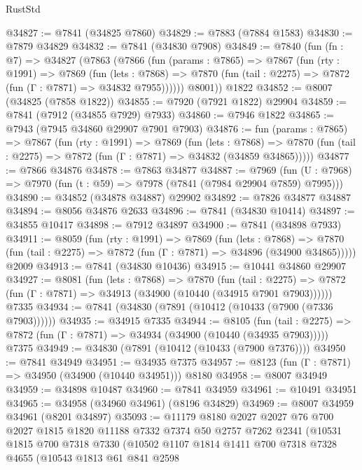 \begin{lexlean}{RustStd}
\begin{coremodule}
{\begin{coremodule}
{{{{{{{{{{{{{{{{{{{{{{{{{{{{{{{{{{{{{{{{{{{{{{{{{{{{{{@34827 := @7841 (@34825 @7860)
@34829 := @7883 (@7884 @1583)
@34830 := @7879 @34829
@34832 := @7841 (@34830 @7908)
@34849 := @7840
    (fun (fn : @7) =>
    @34827
      (@7863
        (@7866
          (fun (params : @7865) =>
          @7867
            (fun (rty : @1991) =>
            @7869
              (fun (lets : @7868) =>
              @7870 (fun (tail : @2275) => @7872 (fun (Γ : @7871) => @34832 @7955))))))
        @8001))
    @1822
@34852 := @8007 (@34825 (@7858 @1822))
@34855 := @7920 (@7921 @1822) @29904
@34859 := @7841 (@7912 (@34855 @7929) @7933)
@34860 := @7946 @1822
@34865 := @7943 (@7945 @34860 @29907 @7901 @7903)
@34876 := fun (params : @7865) =>
  @7867
    (fun (rty : @1991) =>
    @7869
      (fun (lets : @7868) =>
      @7870 (fun (tail : @2275) => @7872 (fun (Γ : @7871) => @34832 (@34859 @34865)))))
@34877 := @7866 @34876
@34878 := @7863 @34877
@34887 := @7969
    (fun (U : @7968) => @7970 (fun (t : @59) => @7978 (@7841 (@7984 @29904 @7859) @7995)))
@34890 := @34852 (@34878 @34887) @29902
@34892 := @7826 @34877 @34887
@34894 := @8056 @34876 @2633
@34896 := @7841 (@34830 @10414)
@34897 := @34855 @10417
@34898 := @7912 @34897
@34900 := @7841 (@34898 @7933)
@34911 := @8059
    (fun (rty : @1991) =>
    @7869
      (fun (lets : @7868) =>
      @7870 (fun (tail : @2275) => @7872 (fun (Γ : @7871) => @34896 (@34900 @34865)))))
    @2009
@34913 := @7841 (@34830 @10436)
@34915 := @10441 @34860 @29907
@34927 := @8081
    (fun (lets : @7868) =>
    @7870
      (fun (tail : @2275) =>
      @7872 (fun (Γ : @7871) => @34913 (@34900 (@10440 (@34915 @7901 @7903))))))
    @7335
@34934 := @7841 (@34830 (@7891 (@10412 (@10433 (@7900 (@7336 @7903))))))
@34935 := @34915 @7335
@34944 := @8105
    (fun (tail : @2275) => @7872 (fun (Γ : @7871) => @34934 (@34900 (@10440 (@34935 @7903)))))
    @7375
@34949 := @34830 (@7891 (@10412 (@10433 (@7900 @7376))))
@34950 := @7841 @34949
@34951 := @34935 @7375
@34957 := @8123 (fun (Γ : @7871) => @34950 (@34900 (@10440 @34951))) @8180
@34958 := @8007 @34949
@34959 := @34898 @10487
@34960 := @7841 @34959
@34961 := @10491 @34951
@34965 := @34958 (@34960 @34961) (@8196 @34829)
@34969 := @8007 @34959 @34961 (@8201 @34897)
@35093 := @11179
    @8180
    @2027
    @2027
    @76
    @700
    @2027
    @1815
    @1820
    @11188
    @7332
    @7374
    @50
    @2757
    @7262
    @2341
    (@10531
      @1815
      @700
      @7318
      @7330
      (@10502
        @1107
        @1814
        @1411
        @700
        @7318
        @7328
        @4655
        (@10543
          @1813
          @61
          @841
          @2598
}}}}}}}}}}}}}}}}}}}}}}}}}}}}}}}}}}}}}}}}}}}}}}}}}}}}}}
\end{coremodule}}
\end{coremodule}
\end{lexlean}

